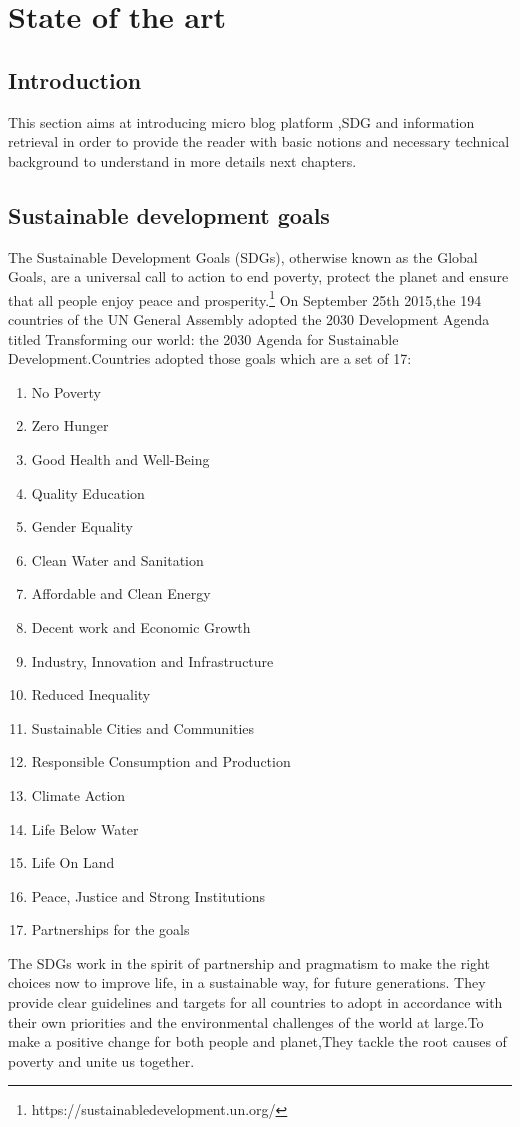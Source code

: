 \chapter{State of the art}
\section{Introduction}
This section aims at introducing micro blog platform ,SDG  and information retrieval in order to provide the reader with basic notions and necessary technical background to understand in more details next chapters. 
\section{Sustainable development goals}
The Sustainable Development Goals (SDGs), otherwise known as the Global Goals, are a universal call to action to end poverty, protect the planet and ensure that all people enjoy peace and prosperity.\footnote{https://sustainabledevelopment.un.org/} 
On September 25th 2015,the 194 countries of the UN General Assembly adopted the 2030 Development Agenda titled Transforming our world: the 2030 Agenda for Sustainable Development.Countries adopted those goals which are a set of 17:
\begin{enumerate}
\item No Poverty
\item Zero Hunger 
\item Good Health and Well-Being
\item Quality Education
\item Gender Equality
\item Clean Water and Sanitation
\item Affordable and Clean Energy
\item Decent work and Economic Growth
\item Industry, Innovation and Infrastructure
\item Reduced Inequality
\item Sustainable Cities and Communities
\item Responsible Consumption and Production
\item Climate Action
\item Life Below Water
\item Life On Land
\item Peace, Justice and Strong Institutions
\item Partnerships for the goals
\end{enumerate}
The SDGs work in the spirit of partnership and pragmatism to make the right choices now to improve life, in a sustainable way, for future generations. They provide clear guidelines and targets for all countries to adopt in accordance with their own priorities and the environmental challenges of the world at large.To make a positive change for both people and planet,They tackle the root causes of poverty and unite us together.
